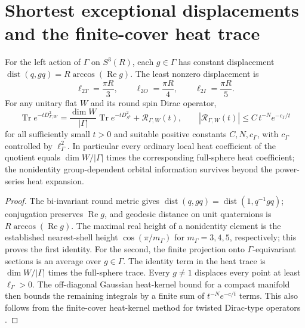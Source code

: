 \documentclass[11pt]{article}
\begin{document}
\section{Shortest exceptional displacements and the finite-cover heat trace}
\label{p1b:sec:v13-heat}

\begin{theorem}
\label{p1b:thm:v13-heat-orbit}
For the left action of $\Gamma$ on $S^3(R)$, each $g\in\Gamma$
has constant displacement
$\operatorname{dist}(q,gq)=R\arccos(\operatorname{Re}g)$.
The least nonzero displacement is
\begin{equation}
\label{p1b:eq:v13-displacements}
 \boxed{\ell_{2T}=\frac{\pi R}{3},\qquad
 \ell_{2O}=\frac{\pi R}{4},\qquad
 \ell_{2I}=\frac{\pi R}{5}.}
\end{equation}
For any unitary flat $W$ and its round spin Dirac operator,
\begin{equation}
\label{p1b:eq:v13-heat-identity}
 \operatorname{Tr}e^{-tD_{\Gamma,W}^2}
 =\frac{\dim W}{|\Gamma|}\operatorname{Tr}e^{-tD_{S^3}^2}
 +\mathcal R_{\Gamma,W}(t),
 \qquad
 |\mathcal R_{\Gamma,W}(t)|
 \le C\,t^{-N}e^{-c_\Gamma/t}
\end{equation}
for all sufficiently small $t>0$ and suitable positive constants
$C,N,c_\Gamma$, with $c_\Gamma$ controlled by
$\ell_\Gamma^2$.  In particular every ordinary local heat
coefficient of the quotient equals $\dim W/|\Gamma|$ times the
corresponding full-sphere heat coefficient; the nonidentity
group-dependent orbital information survives beyond the power-series
heat expansion.
\end{theorem}
\begin{proof}
The bi-invariant round metric gives
$\operatorname{dist}(q,gq)=\operatorname{dist}(1,q^{-1}gq)$;
conjugation preserves $\operatorname{Re}g$, and geodesic distance
on unit quaternions is $R\arccos(\operatorname{Re}g)$.
The maximal real height of a nonidentity element is the established
nearest-shell height $\cos(\pi/m_\Gamma)$ for
$m_\Gamma=3,4,5$, respectively; this proves the first identity.
For the second, the finite projection onto $\Gamma$-equivariant
sections is an average over $g\in\Gamma$. The identity term in the
heat trace is $\dim W/|\Gamma|$ times the full-sphere trace.
Every $g\ne1$ displaces every point at least $\ell_\Gamma>0$.
The off-diagonal Gaussian heat-kernel bound for a compact manifold
then bounds the remaining integrals by a finite sum of
$t^{-N}e^{-c/t}$ terms. This also follows from the finite-cover
heat-kernel method for twisted Dirac-type operators
\cite{CacicMarcolliTeh2014CosmicTopology}.
\end{proof}
\end{document}
